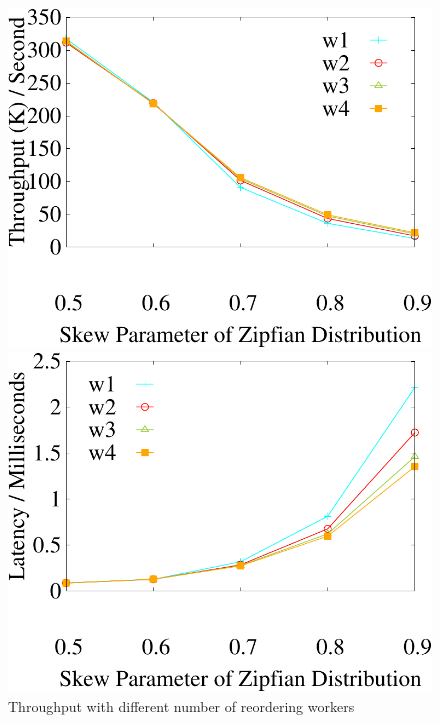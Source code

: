 \begin{figure}[t]
	\centering
	\begin{minipage}[b]{0.31\linewidth}
	\centering
	\includegraphics[width=\textwidth]{./exp_fig/reorder/tps}
	\caption{Throughput with different number of reordering workers}
	\label{fig:reorder:tps}
	\end{minipage}    
	\begin{minipage}[b]{0.31\linewidth}
	\centering
	\includegraphics[width=\textwidth]{./exp_fig/reorder/latency}

\end{minipage}
\end{figure}
